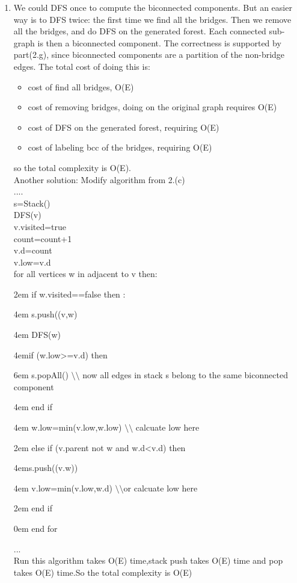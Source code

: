 \documentclass[paper=a4, fontsize=11pt]{scrartcl} %
\numberwithin{equation}{section} %
\numberwithin{figure}{section} %
\numberwithin{table}{section} %
\begin{document}
\begin{enumerate}[label={2.(\alph*)}]
  \item 
    We could DFS once to compute the biconnected components. But an easier way is to DFS twice: the first time we find all the bridges. Then
    we remove all the bridges, and do DFS on the generated forest. Each connected sub-graph is then a biconnected component. The correctness
    is supported by part(2.g), since biconnected components are a partition of the non-bridge edges. The total cost of doing this is:
    \begin{itemize}
      \item cost of find all bridges, O(E)
      \item cost of removing bridges, doing on the original graph requires O(E)
      \item cost of DFS on the generated forest, requiring O(E)
      \item cost of labeling bcc of the bridges, requiring O(E)
    \end{itemize}
    so the total complexity is O(E).
\\
Another solution:
Modify algorithm from 2.(c)\\
....\\
s=Stack()\\
DFS(v)\\
	v.visited=true\\
	count=count+1\\
	v.d=count\\
	v.low=v.d\\
	for all vertices w in adjacent to v then: \par
		\setlength{\parindent} {2em} if w.visited==false then :\par
			\setlength{\parindent} {4em} s.push((v,w)\par
			\setlength{\parindent} {4em} DFS(w)\par
			\setlength{\parindent} {4em}if (w.low>=v.d) then \par
			\setlength{\parindent} {6em}	s.popAll() $\setminus\setminus$ now all edges in stack s belong to the same biconnected component \par
			\setlength{\parindent} {4em} end if\par
			\setlength{\parindent} {4em} w.low=min(v.low,w.low) $\setminus\setminus$ calcuate low here \par
		\setlength{\parindent} {2em} else if (v.parent not w and w.d<v.d) then \par
			\setlength{\parindent} {4em}s.push((v.w)) \par
			\setlength{\parindent} {4em} v.low=min(v.low,w.d)  $\setminus\setminus$or calcuate low here  \par
		\setlength{\parindent} {2em} end if  \par
\setlength{\parindent} {0em} end for \par
...\\
Run this algorithm takes O(E) time,stack push takes O(E) time and pop takes O(E) time.So the total complexity  is O(E)
\end{enumerate}
\end{document}
